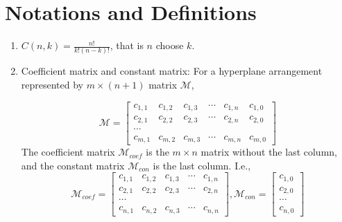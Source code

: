 \documentclass[12pt, a4paper]{article}
\newtheorem{theorem}{Theorema}[subsection]
\theoremstyle{definition}
\theoremstyle{remark}
\newcommand{\bb}[1]{\mathbb{#1}}
\begin{document}
%
%
%
%
%
%

\section*{Notations and Definitions}

\begin{enumerate}
	\item $C(n, k) = \frac{n!}{k!(n-k)!}$, that is $n$ choose $k$.
	\item Coefficient matrix and constant matrix: 
	For a hyperplane arrangement represented by $m \times (n+1) $ matrix $\mathcal{M}$, 

	$$
	\mathcal{M} =
	\begin{bmatrix}
		c_{1,1} & c_{1,2} & c_{1,3} & \cdots & c_{1,n} & c_{1,0} \\
		c_{2,1} & c_{2,2} & c_{2,3} & \cdots & c_{2,n} & c_{2,0} 
			 \\ \cdots \\
		c_{m,1} & c_{m,2} & c_{m,3} & \cdots & c_{m,n} & c_{m,0}
	\end{bmatrix}
	$$
	The coefficient matrix $\mathcal{M}_{coef}$ is the $ m \times n$ matrix without the last column, and the constant matrix $\mathcal{M}_{con}$ is the last column. I.e., 
	$$
	\mathcal{M}_{coef} =
	\begin{bmatrix}
		c_{1,1} & c_{1,2} & c_{1,3} & \cdots & c_{1,n} \\
		c_{2,1} & c_{2,2} & c_{2,3} & \cdots & c_{2,n} 
			 \\ \cdots \\
		c_{n,1} & c_{n,2} & c_{n,3} & \cdots & c_{n,n}
	\end{bmatrix}
	, \mathcal{M}_{con} =
	\begin{bmatrix}
		c_{1,0} \\
		c_{2,0} \\
		\cdots \\
		c_{n,0}
	\end{bmatrix}
	$$
\end{enumerate}
\end{document}
